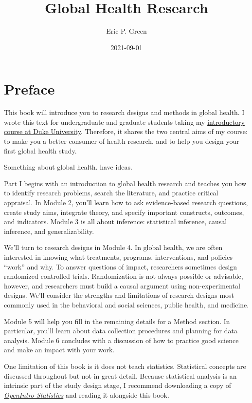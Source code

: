 \documentclass[justified,twoside,symmetric,]{tufte-book}
\title{Global Health Research}
\author{Eric P. Green}
\date{2021-09-01}
\renewcommand*{\citet}[1]{{\cite{#1}}}
\begin{document}
\maketitle



{
\setcounter{tocdepth}{0}
\tableofcontents
}

\hypertarget{preface}{%
\chapter*{Preface}\label{preface}}

This book will introduce you to research designs and methods in global health. I wrote this text for undergraduate and graduate students taking my \href{http://www.globalhealthresearch.co/}{introductory course at Duke University}. Therefore, it shares the two central aims of my course: to make you a better consumer of health research, and to help you design your first global health study.

Something about global health. \citet{white:2017} have ideas.

Part I begins with an introduction to global health research and teaches you how to identify research problems, search the literature, and practice critical appraisal. In Module 2, you'll learn how to ask evidence-based research questions, create study aims, integrate theory, and specify important constructs, outcomes, and indicators. Module 3 is all about inference: statistical inference, causal inference, and generalizability.

We'll turn to research designs in Module 4. In global health, we are often interested in knowing what treatments, programs, interventions, and policies ``work'' and why. To answer questions of impact, researchers sometimes design randomized controlled trials. Randomization is not always possible or advisable, however, and researchers must build a causal argument using non-experimental designs. We'll consider the strengths and limitations of research designs most commonly used in the behavioral and social sciences, public health, and medicine.

Module 5 will help you fill in the remaining details for a Method section. In particular, you'll learn about data collection procedures and planning for data analysis. Module 6 concludes with a discussion of how to practice good science and make an impact with your work.

One limitation of this book is it does not teach statistics. Statistical concepts are discussed throughout but not in great detail. Because statistical analysis is an intrinsic part of the study design stage, I recommend downloading a copy of \href{https://www.openintro.org/stat/}{\emph{OpenIntro Statistics}} and reading it alongside this book.
\end{document}
